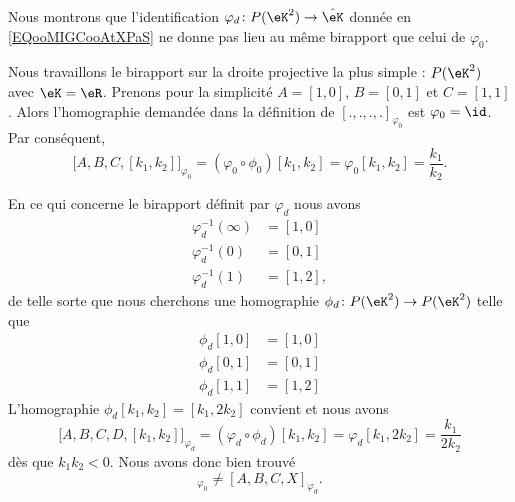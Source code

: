 \begin{example}        \label{EXooYCOYooWFSfUv}
    Nous montrons que l'identification \( \varphi_d\colon P(\eK^2)\to \hat\eK\) donnée en \eqref{EQooMIGCooAtXPaS} ne donne pas lieu au même birapport que celui de \( \varphi_0\).

    Nous travaillons le birapport sur la droite projective la plus simple : \( P(\eK^2)\) avec \( \eK=\eR\). Prenons pour la simplicité \( A=[1,0]\), \( B=[0,1]\) et \( C=[1,1]\). Alors l'homographie demandée dans la définition de \( [.,.,.,.]_{\varphi_0}\) est \( \varphi_0=\id\). Par conséquent,
    \begin{equation}
        \big[ A,B,C,[k_1,k_2] \big]_{\varphi_0}=(\varphi_0\circ\phi_0)[k_1,k_2]=\varphi_0[k_1,k_2]=\frac{ k_1 }{ k_2 }.
    \end{equation}

    En ce qui concerne le birapport définit par \( \varphi_d\) nous avons
    \begin{subequations}
        \begin{align}
            \varphi_d^{-1}(\infty)&=[1,0]\\
            \varphi_d^{-1}(0)&=[0,1]\\
            \varphi_d^{-1}(1)&=[1,2],
        \end{align}
    \end{subequations}
    de telle sorte que nous cherchons une homographie \( \phi_d\colon P(\eK^2)\to P(\eK^2)\) telle que
    \begin{subequations}
        \begin{align}
            \phi_d[1,0]&=[1,0]\\
            \phi_d[0,1]&=[0,1]\\
            \phi_d[1,1]&=[1,2]
        \end{align}
    \end{subequations}
    L'homographie \( \phi_d[k_1,k_2]=[k_1,2k_2]\) convient et nous avons
    \begin{equation}
        \big[ A,B,C,D,[k_1,k_2] \big]_{\varphi_d}=(\varphi_d\circ\phi_d)[k_1,k_2]=\varphi_d[k_1,2k_2]=\frac{ k_1 }{ 2k_2 }
    \end{equation}
    dès que \( k_1k_2<0\). Nous avons donc bien trouvé
    \begin{equation}
        [A,B,C,X]_{\varphi_0}\neq [A,B,C,X]_{\varphi_d}.
    \end{equation}
\end{example}

